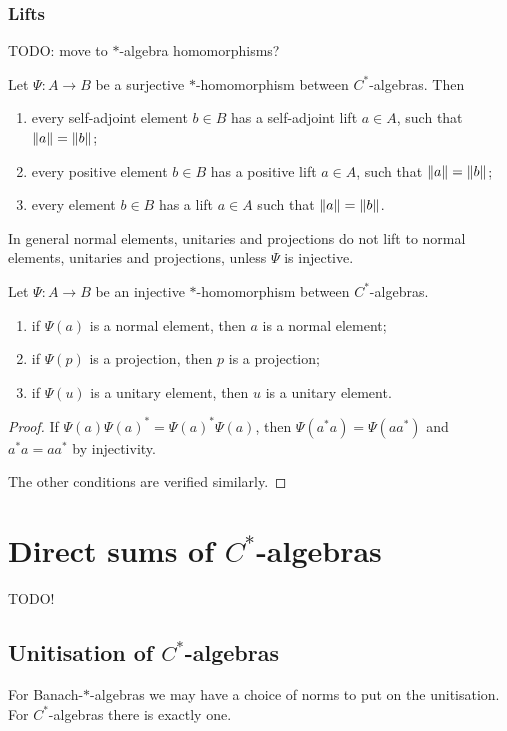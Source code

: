 \subsubsection{Lifts}
TODO: move to $*$-algebra homomorphisms?
\begin{proposition}
Let $\Psi: A \to B$ be a surjective $*$-homomorphism between $C^*$-algebras. Then
\begin{enumerate}
\item every self-adjoint element $b\in B$ has a self-adjoint lift $a\in A$, such that $\lVert a\rVert = \lVert b\rVert$;
\item every positive element $b\in B$ has a positive lift $a\in A$, such that $\lVert a\rVert = \lVert b\rVert$;
\item every element $b\in B$ has a lift $a\in A$ such that $\lVert a\rVert = \lVert b\rVert$.
\end{enumerate}
\end{proposition}
In general normal elements, unitaries and projections do not lift to normal elements, unitaries and projections, unless $\Psi$ is injective.
\begin{lemma} \label{injectiveLifts}
Let $\Psi: A \to B$ be an injective $*$-homomorphism between $C^*$-algebras.
\begin{enumerate}
\item if $\Psi(a)$ is a normal element, then $a$ is a normal element;
\item if $\Psi(p)$ is a projection, then $p$ is a projection;
\item if $\Psi(u)$ is a unitary element, then $u$ is a unitary element.
\end{enumerate}
\end{lemma}
\begin{proof}
If $\Psi(a)\Psi(a)^* = \Psi(a)^*\Psi(a)$, then $\Psi(a^*a) = \Psi(aa^*)$ and $a^*a = aa^*$ by injectivity.

The other conditions are verified similarly.
\end{proof}

\section{Direct sums of $C^*$-algebras}
TODO!

\subsection{Unitisation of $C^*$-algebras}
For Banach-$*$-algebras we may have a choice of norms to put on the unitisation. For $C^*$-algebras there is exactly one.

